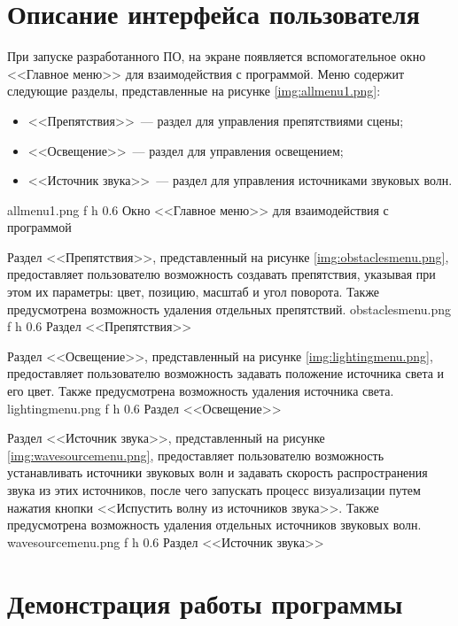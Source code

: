 \section{Описание интерфейса пользователя}

При запуске разработанного ПО, на экране появляется вспомогательное окно <<Главное меню>> для взаимодействия с программой.
Меню содержит следующие разделы, представленные на рисунке \ref{img:allmenu1.png}:
\begin{itemize}
	\item <<Препятствия>>~--- раздел для управления препятствиями сцены;
	\item <<Освещение>>~--- раздел для управления освещением;
	\item <<Источник звука>>~--- раздел для управления источниками звуковых волн.
\end{itemize}
	{allmenu1.png}
	{f}
	{h}
	{0.6\textwidth}
	{Окно <<Главное меню>> для взаимодействия с программой}

\clearpage

Раздел <<Препятствия>>, представленный на рисунке \ref{img:obstaclesmenu.png}, предоставляет пользователю возможность создавать препятствия, указывая при этом их параметры: цвет, позицию, масштаб и угол поворота.
Также предусмотрена возможность удаления отдельных препятствий.
	{obstaclesmenu.png}
	{f}
	{h}
	{0.6\textwidth}
	{Раздел <<Препятствия>>}
	
\clearpage
	
Раздел <<Освещение>>, представленный на рисунке \ref{img:lightingmenu.png}, предоставляет пользователю возможность задавать положение источника света и его цвет.
Также предусмотрена возможность удаления источника света.
	{lightingmenu.png}
	{f}
	{h}
	{0.6\textwidth}
	{Раздел <<Освещение>>}
	
\clearpage

Раздел <<Источник звука>>, представленный на рисунке \ref{img:wavesourcemenu.png}, предоставляет пользователю возможность устанавливать источники звуковых волн и задавать скорость распространения звука из этих источников, после чего запускать процесс визуализации путем нажатия кнопки <<Испустить волну из источников звука>>.
Также предусмотрена возможность удаления отдельных источников звуковых волн.
	{wavesourcemenu.png}
	{f}
	{h}
	{0.6\textwidth}
	{Раздел <<Источник звука>>}

\section{Демонстрация работы программы}


